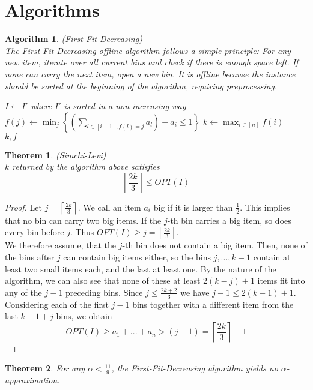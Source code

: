 \documentclass[a4paper, 12pt]{article}
\newtheorem{theorem}{Theorem}[section]
\newtheorem{alg}{Algorithm}[section]
\begin{document}
	\section{Algorithms}
	\begin{alg} (First-Fit-Decreasing)\\
		The First-Fit-Decreasing offline algorithm follows a simple principle: For any new item, iterate over all current bins and check if there is enough space left. If none can carry the next item, open a new bin. It is offline because the instance should be sorted at the beginning of the algorithm, requiring preprocessing. \\\normalfont
		\begin{algorithmic}[1]
			\State $I \gets I'$ where $I'$ is sorted in a non-increasing way
			\State $f(j) \gets \min_j \left\{(\sum_{l \in [i-1], f(l) = j} a_l) + a_i \leq 1\right\}$
			\EndFor
			\State $k \gets \max_{i \in [n]} f(i)$\\
			\Return $k,f$
		\end{algorithmic}
	\end{alg}
	\begin{theorem} (Simchi-Levi)\\
		$k$ returned by the algorithm above satisfies \[\left\lceil\frac{2k}{3} \right\rceil\leq OPT(I)\]
	\end{theorem}
	\begin{proof}
		Let $j = \left\lceil\frac{2k}{3}\right\rceil$. We call an item $a_i$ big if it is larger than $\frac{1}{2}$. This implies that no bin can carry two big items. If the $j$-th bin carries a big item, so does every bin before $j$. Thus $OPT(I) \geq j = \left\lceil\frac{2k}{3}\right\rceil$.\\
		We therefore assume, that the $j$-th bin does not contain a big item. Then, none of the bins after $j$ can contain big items either, so the bins $j,...,k-1$ contain at least two small items each, and the last at least one. By the nature of the algorithm, we can also see that none of these at least $2(k-j)+1$ items fit into any of the $j-1$ preceding bins.
		Since $j \leq \frac{2k+2}{3}$ we have $j-1 \leq 2(k-1)+1$. Considering each of the first $j-1$ bins together with a different item from the last $k-1+j$ bins, we obtain \[OPT(I) \geq a_1+...+a_n > (j-1) = \left\lceil\frac{2k}{3}\right\rceil -1\]
	\end{proof}
	\begin{theorem}
		For any $\alpha < \frac{11}{9}$, the First-Fit-Decreasing algorithm yields no $\alpha$-approximation. 
	\end{theorem}
\end{document}
